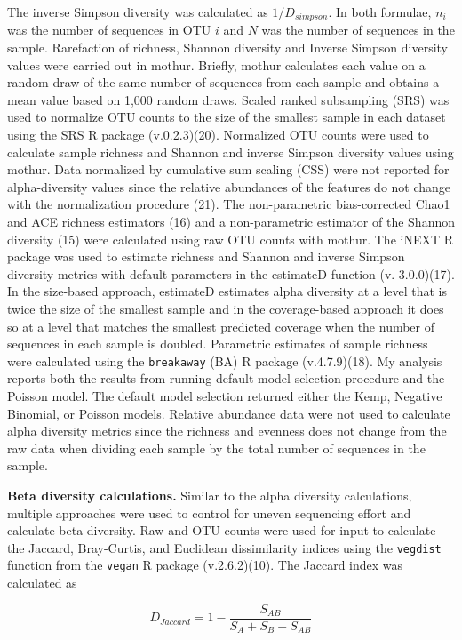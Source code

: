 \documentclass[
]{article}
\begin{document}
The inverse Simpson diversity was calculated as \(1/D_{simpson}\). In
both formulae, \(n_i\) was the number of sequences in OTU \(i\) and
\(N\) was the number of sequences in the sample. Rarefaction of
richness, Shannon diversity and Inverse Simpson diversity values were
carried out in mothur. Briefly, mothur calculates each value on a random
draw of the same number of sequences from each sample and obtains a mean
value based on 1,000 random draws. Scaled ranked subsampling (SRS) was
used to normalize OTU counts to the size of the smallest sample in each
dataset using the SRS R package (v.0.2.3)(20). Normalized OTU counts
were used to calculate sample richness and Shannon and inverse Simpson
diversity values using mothur. Data normalized by cumulative sum scaling
(CSS) were not reported for alpha-diversity values since the relative
abundances of the features do not change with the normalization
procedure (21). The non-parametric bias-corrected Chao1 and ACE richness
estimators (16) and a non-parametric estimator of the Shannon diversity
(15) were calculated using raw OTU counts with mothur. The iNEXT R
package was used to estimate richness and Shannon and inverse Simpson
diversity metrics with default parameters in the estimateD function (v.
3.0.0)(17). In the size-based approach, estimateD estimates alpha
diversity at a level that is twice the size of the smallest sample and
in the coverage-based approach it does so at a level that matches the
smallest predicted coverage when the number of sequences in each sample
is doubled. Parametric estimates of sample richness were calculated
using the \texttt{breakaway} (BA) R package (v.4.7.9)(18). My analysis
reports both the results from running default model selection procedure
and the Poisson model. The default model selection returned either the
Kemp, Negative Binomial, or Poisson models. Relative abundance data were
not used to calculate alpha diversity metrics since the richness and
evenness does not change from the raw data when dividing each sample by
the total number of sequences in the sample.

\textbf{Beta diversity calculations.} Similar to the alpha diversity
calculations, multiple approaches were used to control for uneven
sequencing effort and calculate beta diversity. Raw and OTU counts were
used for input to calculate the Jaccard, Bray-Curtis, and Euclidean
dissimilarity indices using the \texttt{vegdist} function from the
\texttt{vegan} R package (v.2.6.2)(10). The Jaccard index was calculated
as

\[D_{Jaccard}=1-\frac{S_{AB}}{S_A+S_B-S_{AB}}\]
\end{document}
